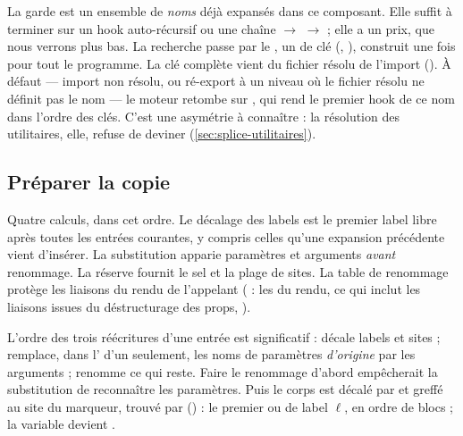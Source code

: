 
La garde est un ensemble de \emph{noms} déjà expansés dans ce composant. Elle suffit à terminer sur un hook auto-récursif ou une chaîne  $\to$  $\to$  ; elle a un prix, que nous verrons plus bas. La recherche passe par le , un  de clé  (, ), construit une fois pour tout le programme. La clé complète vient du fichier résolu de l'import (). À défaut --- import non résolu, ou ré-export à un niveau où le fichier résolu ne définit pas le nom --- le moteur retombe sur , qui rend le premier hook de ce nom dans l'ordre des clés. C'est une asymétrie à connaître : la résolution des utilitaires, elle, refuse de deviner (\cref{sec:splice-utilitaires}).

\subsection{Préparer la copie}


Quatre calculs, dans cet ordre. Le décalage des labels est \og le premier label libre après toutes les entrées courantes\fg{}, y compris celles qu'une expansion précédente vient d'insérer. La substitution  apparie paramètres et arguments \emph{avant} renommage. La réserve fournit le sel et la plage de sites. La table de renommage protège les liaisons du rendu de l'appelant ( : les  du rendu, ce qui inclut les liaisons issues du déstructurage des props, ).


L'ordre des trois réécritures d'une entrée est significatif :  décale labels et sites ;  remplace, dans l' d'un  seulement, les noms de paramètres \emph{d'origine} par les arguments ;  renomme ce qui reste. Faire le renommage d'abord empêcherait la substitution de reconnaître les paramètres. Puis le corps est décalé par  et greffé au site du marqueur, trouvé par  () : le premier  ou  de label $\ell$, en ordre de blocs ; la variable  devient .

